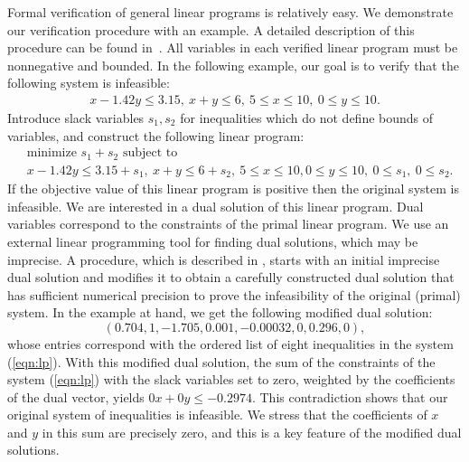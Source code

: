 Formal verification of general linear programs is relatively easy. We
demonstrate our verification procedure with an example. A detailed
description of this procedure can be found in~\cite{Solovyev:LP}. All
variables in each verified linear program must be nonnegative and
bounded. In the following example, our goal is to verify that the
following system is infeasible:
\begin{equation*}
\begin{split}
x - 1.42 y \le 3.15,\ x + y \le 6,\ 
5 \le x \le 10,\ 0 \le y \le 10.
\end{split}
\end{equation*}
Introduce slack variables $s_1, s_2$ for inequalities which do not
define bounds of variables, and construct the following linear program:
\begin{equation}\label{eqn:lp}
\begin{split}
&\text{minimize $s_1 + s_2$ subject to}\\
&x - 1.42 y \le 3.15 + s_1,\ x + y \le 6 + s_2,\ 
5 \le x \le 10, 0 \le y \le 10,\ 
0 \le s_1,\ 0 \le  s_2.
\end{split}
\end{equation}
If the objective value of this linear program is positive then the
original system is infeasible. We are interested in a dual solution of
this linear program. Dual variables correspond to the constraints of
the primal linear program. We use an external linear programming tool
for finding dual solutions, which may be imprecise.  A procedure,
which is described in \cite{Solovyev:LP}, starts with an initial
imprecise dual solution and modifies it to obtain a carefully
constructed dual solution that has sufficient numerical precision to
prove the infeasibility of the original (primal) system.  In the
example at hand, we get the following modified dual solution:
\[
 (0.704, 1, -1.705, 0.001, -0.00032, 0, 0.296, 0),
\]
whose entries correspond with the ordered list of eight inequalities
in the system (\ref{eqn:lp}).  With this modified dual solution, the
sum of the constraints of the system (\ref{eqn:lp}) with the slack
variables set to zero, weighted by the coefficients of the dual
vector, yields $0 x + 0 y \le -0.2974$. This contradiction shows that
our original system of inequalities is infeasible.  We stress that the
coefficients of $x$ and $y$ in this sum are precisely zero, and this
is a key feature of the modified dual solutions.

